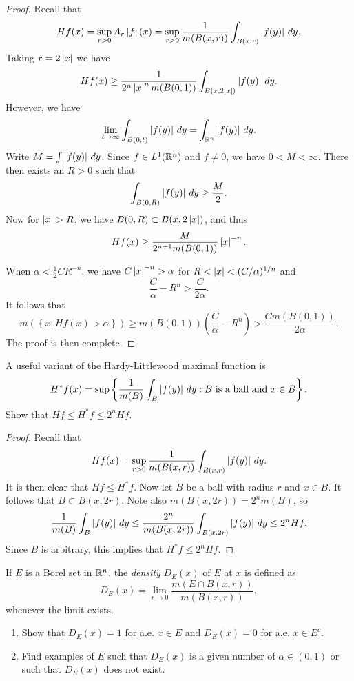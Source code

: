 \documentclass[a4paper]{article}
\begin{document}
\begin{proof}
Recall that 
\[
H f (x) 
= \sup_{r > 0} A_r \left\lvert f\right\rvert (x)
= \sup_{r > 0} \frac{1}{m( B(x, r) )} \int_{B(x, r)} \left\lvert f(y)\right\rvert
\, d y.
\]
Taking $r = 2 \left\lvert x\right\rvert$ we have 
\[
\begin{aligned}
H f (x)
\geq \frac{1}{2^n \left\lvert x\right\rvert^n m( B(0, 1) )} 
\int_{B(x, 2 \left\lvert x\right\rvert)} \left\lvert f(y)\right\rvert \, d y. 
\end{aligned}
\]
However, we have 
\[
\lim_{t \to \infty} \int_{B(0, t)} \left\lvert f(y)\right\rvert \, d y 
= \int_{\mathbb{R}^n} \left\lvert f(y)\right\rvert \, d y.
\]
Write $M = \int \left\lvert f(y)\right\rvert \, d y$. Since $f \in L^1 (\mathbb{R}^n)$
and $f \neq 0$, we have $0 < M < \infty$. There then 
exists an $R > 0$ such that 
\[
\int_{ B(0, R) } \left\lvert f(y)\right\rvert \, d y \geq \frac{M}{2}.
\]
Now for $\left\lvert x\right\rvert > R$, we have $B(0, R) \subset B(x, 2 \left\lvert x\right\rvert)$,
and thus 
\[
H f(x) \geq \frac{M}{2^{n + 1} m( B(0, 1) )} \left\lvert x\right\rvert^{-n}.
\]

When $\alpha < \frac{1}{2} C R^{-n}$, we have 
$C \left\lvert x\right\rvert^{-n} > \alpha$ for $R < \left\lvert x\right\rvert < (C / \alpha)^{1 / n}$
and
\[
\frac{C}{\alpha} - R^n > \frac{C}{2 \alpha}.
\]
It follows that 
\[
m (\left\{ x : H f(x) > \alpha \right\})
\geq m( B(0, 1) ) \left( \frac{C}{\alpha} - R^n \right)
> \frac{C m ( B(0, 1) )}{2 \alpha}.
\]
The proof is then complete.
\end{proof}

\begin{ex}[Folland 3.23]
A useful variant of the Hardy-Littlewood maximal function is 
\[
H^* f(x) = \sup \left\{  \frac{1}{m(B)} \int_B \left\lvert f(y)\right\rvert
\, d y : \text{$B$ is a ball and $x \in B$} \right\}.
\]
Show that $H f \leq H^* f \leq 2^n H f$.
\end{ex}

\begin{proof}
Recall that 
\[
H f(x) = \sup_{r > 0} \frac{1}{m (B(x, r))} 
\int_{B(x, r)} \left\lvert f(y)\right\rvert \, d y.
\]
It is then clear that $Hf \leq H^* f$. Now let $B$ be a ball
with radius $r$ and $x \in B$. It follows that 
$B \subset B(x, 2r)$. Note also $m(B(x, 2r)) = 2^n m(B)$, so
\[
\frac{1}{m(B)} \int_B \left\lvert f(y)\right\rvert \, d y 
\leq \frac{2^n}{m( B(x, 2r) )} \int_{ B(x, 2r) } \left\lvert f(y)\right\rvert \, d y
\leq 2^n H f.
\]
Since $B$ is arbitrary, this implies that $H^* f \leq 2^n H f$.
\end{proof}

\begin{ex}[Follan 3.25]
If $E$ is a Borel set in $\mathbb{R}^n$, the \emph{density} $D_E(x)$ of $E$ 
at $x$ is defined as 
\[
D_E (x) = \lim_{r \to 0} \frac{m(E \cap B(x, r))}{m(B(x, r))},
\]
whenever the limit exists.

\begin{enumerate}
\item Show that $D_E (x) = 1$ for a.e. $x \in E$ and 
$D_E (x) = 0$ for a.e. $x \in E^c$.
\item Find examples of $E$ such that $D_E(x)$ is a given number 
of $\alpha \in (0, 1)$ or such that $D_E(x)$ does not exist.
\end{enumerate}
\end{ex}
\end{document}
